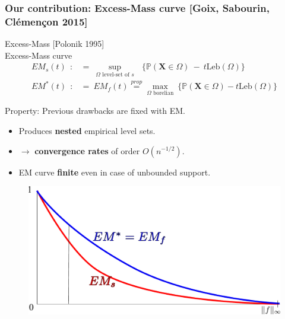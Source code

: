 \documentclass[9pt]{beamer}
\newcommand\blue{\color{blue} }
\def\mb{\mathbf}
\def\leb{\text{Leb}}
\begin{document}
\begin{frame}
\frametitle{Our contribution: Excess-Mass curve  {\small [Goix, Sabourin, Clémençon 2015]}}

Excess-Mass {\small [Polonik 1995]}\\
{\blue \large Excess-Mass curve }
\begin{align*}
EM_s(t) ~~:&=~ \sup_{\Omega \text{ level-set of } s}~~~\big\{ \mathbb{P}(\mb X \in \Omega) ~-~ t \leb(\Omega) \big\}\\
EM^*(t) ~~:&=~  EM_f(t) \overset{prop}{=}  \max_{\Omega\text{ borelian} } ~\big\{{\mathbb{P}} (\mb X\in \Omega)-t\leb(\Omega) \big\} 
\end{align*}

\begin{alertblock}{Property: Previous drawbacks are fixed with EM.}
\begin{itemize}
\item Produces \textbf{nested} empirical level sets.
\item $\to$ \textbf{convergence rates} of order $O(n^{-1/2})$.
\item EM curve \textbf{finite} even in case of unbounded support.
\end{itemize}
\end{alertblock}


\begin{figure}
\includegraphics[width = 0.6\linewidth]{sourcefigs/em.pdf}
\end{figure}


\end{frame}


\end{document}
